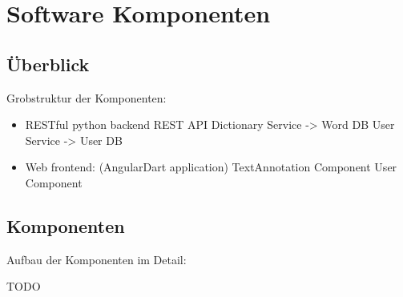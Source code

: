 \section{Software Komponenten}

\subsection{Überblick}

Grobstruktur der Komponenten:

\begin{itemize}
	\item RESTful python backend
		\subitem REST API
		\subitem Dictionary Service -> Word DB
		\subitem User Service -> User DB
	\item Web frontend: (AngularDart application)
		\subitem TextAnnotation Component
		\subitem User Component
\end{itemize}

\subsection{Komponenten}
Aufbau der Komponenten im Detail:

TODO